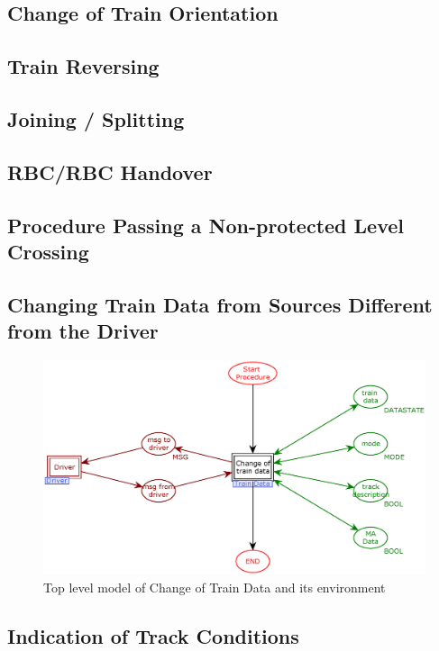 \documentclass{template/openetcs_article}
\begin{document}
\subsection{Change of Train Orientation}

\subsection{Train Reversing}

\subsection{Joining / Splitting}

\subsection{RBC/RBC Handover}

\subsection{Procedure Passing a Non-protected Level Crossing}

\subsection{Changing Train Data from Sources Different from the Driver}

\begin{figure}[htb] 
  \centering
  \includegraphics[scale=0.5]{CoTD-toplevel.eps}
  \caption{Top level model of Change of Train Data and its environment}
  \label{fig:Change of Train Data-toplevel}
\end{figure}

\subsection{Indication of Track Conditions}
\end{document}

